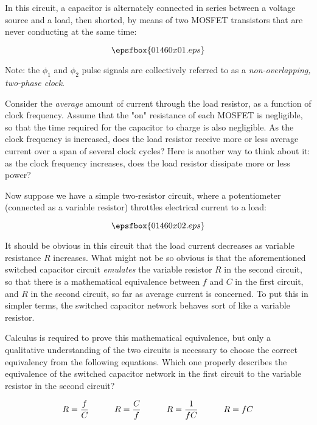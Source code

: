 

In this circuit, a capacitor is alternately connected in series between a voltage source and a load, then shorted, by means of two MOSFET transistors that are never conducting at the same time:

$$\epsfbox{01460x01.eps}$$

Note: the $\phi_1$ and $\phi_2$ pulse signals are collectively referred to as a {\it non-overlapping, two-phase clock}.

Consider the {\it average} amount of current through the load resistor, as a function of clock frequency.  Assume that the "on" resistance of each MOSFET is negligible, so that the time required for the capacitor to charge is also negligible.  As the clock frequency is increased, does the load resistor receive more or less average current over a span of several clock cycles?  Here is another way to think about it: as the clock frequency increases, does the load resistor dissipate more or less power? 

\vskip 10pt

Now suppose we have a simple two-resistor circuit, where a potentiometer (connected as a variable resistor) throttles electrical current to a load:

$$\epsfbox{01460x02.eps}$$

It should be obvious in this circuit that the load current decreases as variable resistance $R$ increases.  What might not be so obvious is that the aforementioned switched capacitor circuit {\it emulates} the variable resistor $R$ in the second circuit, so that there is a mathematical equivalence between $f$ and $C$ in the first circuit, and $R$ in the second circuit, so far as average current is concerned.  To put this in simpler terms, the switched capacitor network behaves sort of like a variable resistor.

Calculus is required to prove this mathematical equivalence, but only a qualitative understanding of the two circuits is necessary to choose the correct equivalency from the following equations.  Which one properly describes the equivalence of the switched capacitor network in the first circuit to the variable resistor in the second circuit?

$$R = {f \over C} \hskip 30pt R = {C \over f} \hskip 30pt R = {1 \over fC} \hskip 30pt R = fC$$

